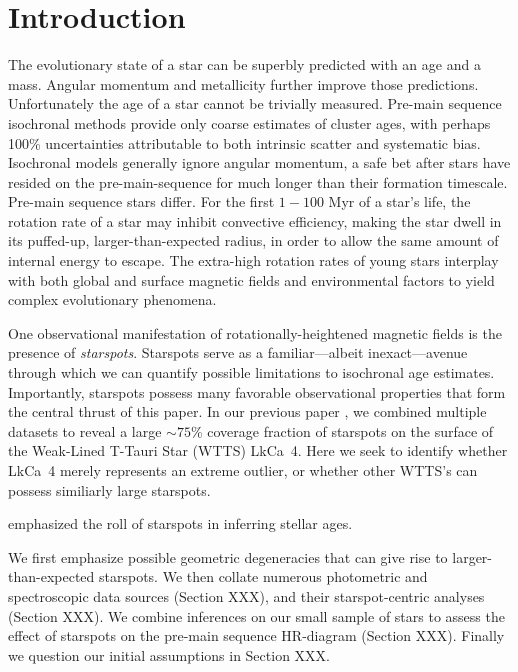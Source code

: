 \documentclass[twocolumn]{emulateapj}%
\begin{document}
\maketitle

\section{Introduction}\label{sec:intro}

The evolutionary state of a star can be superbly predicted with an age and a mass.  Angular momentum and metallicity further improve those predictions.  Unfortunately the age of a star cannot be trivially measured.  Pre-main sequence isochronal methods provide only coarse estimates of cluster ages, with perhaps 100\% uncertainties attributable to both intrinsic scatter and systematic bias.  Isochronal models generally ignore angular momentum, a safe bet after stars have resided on the pre-main-sequence for much longer than their formation timescale.  Pre-main sequence stars differ.  For the first $1-100$ Myr of a star's life, the rotation rate of a star may inhibit convective efficiency, making the star dwell in its puffed-up, larger-than-expected radius, in order to allow the same amount of internal energy to escape.  The extra-high rotation rates of young stars interplay with both global and surface magnetic fields and environmental factors to yield complex evolutionary phenomena.

One observational manifestation of rotationally-heightened magnetic fields is the presence of \emph{starspots}.  Starspots serve as a familiar---albeit inexact---avenue through which we can quantify possible limitations to isochronal age estimates.  Importantly, starspots possess many favorable observational properties that form the central thrust of this paper.  In our previous paper \citep{2017ApJ...836..200G}, we combined multiple datasets to reveal a large $\sim75\%$ coverage fraction of starspots on the surface of the Weak-Lined T-Tauri Star (WTTS) LkCa~4.  Here we seek to identify whether LkCa~4 merely represents an extreme outlier, or whether other WTTS's can possess similiarly large starspots.

\citet{somers15} emphasized the roll of starspots in inferring stellar ages.

We first emphasize possible geometric degeneracies that can give rise to larger-than-expected starspots.  We then collate numerous photometric and spectroscopic data sources (Section XXX), and their starspot-centric analyses (Section XXX).  We combine inferences on our small sample of stars to assess the effect of starspots on the pre-main sequence HR-diagram (Section XXX).  Finally we question our initial assumptions in Section XXX.
\end{document}
